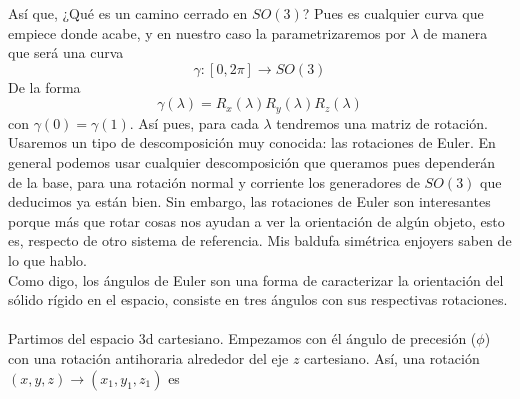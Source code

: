 \documentclass[12pt]{article}
\begin{document}
Así que, ¿Qué es un camino cerrado en $SO(3)$? Pues es cualquier curva que empiece donde acabe, y en nuestro caso la parametrizaremos por $\lambda$ de manera que será una curva
$$\gamma: [0,2\pi]\rightarrow SO(3)$$
De la forma
$$\gamma(\lambda) =R_x(\lambda)R_y(\lambda)R_z(\lambda)$$
con $\gamma(0)=\gamma(1)$. Así pues, para cada $\lambda$ tendremos una matriz de rotación. Usaremos un tipo de descomposición muy conocida: las rotaciones de Euler. En general podemos usar cualquier descomposición que queramos pues dependerán de la base, para una rotación normal y corriente los generadores de $SO(3)$ que deducimos ya están bien. Sin embargo,  las rotaciones de Euler son interesantes porque más que rotar cosas nos ayudan a ver la orientación de algún objeto, esto es, respecto de otro sistema de referencia. Mis baldufa simétrica enjoyers saben de lo que hablo. \\
Como digo, los ángulos de Euler son una forma de caracterizar la orientación del sólido rígido en el espacio, consiste en tres ángulos con sus respectivas rotaciones. \\\\
Partimos del espacio 3d cartesiano. Empezamos con él ángulo de precesión  ($\phi$) con una rotación antihoraria alrededor del eje $z$ cartesiano. Así, una rotación $(x,y,z)\rightarrow (x_1,y_1,z_1)$ es 
\begin{center}
\end{center}
\end{document}
